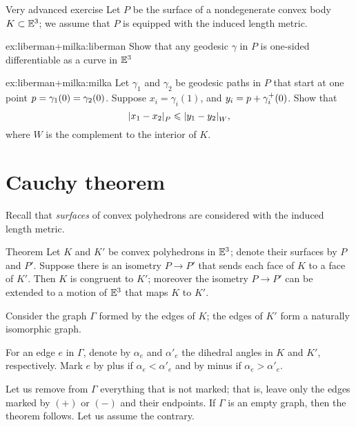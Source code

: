 \begin{thm}{Very advanced exercise}\label{ex:liberman+milka}
Let $P$ be the surface of a nondegenerate convex body $K\subset\mathbb{E}^3$;
we assume that $P$ is equipped with the induced length metric.

\begin{subthm}{ex:liberman+milka:liberman}
Show that any geodesic $\gamma$ in $P$ is one-sided differentiable as a curve in $\mathbb{E}^3$
\end{subthm}

\begin{subthm}{ex:liberman+milka:milka}
Let $\gamma_1$ and $\gamma_2$ be geodesic paths in $P$ that start at one point $p=\gamma_1(0)=\gamma_2(0)$.
Suppose $x_i=\gamma_i(1)$, and $y_i=p+\gamma_i^+(0)$.
Show that
\[|{x_1}-{x_2}|_{P}^{{}}\leqslant |{y_1}-{y_2}|_{W}^{{}},\]
where $W$ is the complement to the interior of $K$.
\end{subthm}

\end{thm}


\section{Cauchy theorem}

Recall that \textit{surfaces} of convex polyhedrons are considered with the induced length metric.
 
\begin{thm}{Theorem}\label{thm:cauchy} Let $K$ and $K'$ be convex polyhedrons in $\mathbb{E}^3$;
denote their surfaces 
by $P$ and $P'$.
Suppose there is an isometry $P\to P'$ that sends each face of $K$ to a face of $K'$.
Then $K$ is congruent to $K'$; moreover the isometry $P\to P'$ can be extended to a motion of $\mathbb{E}^3$ that maps $K$  to $K'$.
\end{thm}

Consider the graph $\Gamma$ formed by the edges of $K$;
the edges of $K'$ form a naturally isomorphic graph.
 
For an edge $e$ in $\Gamma$, denote by $\alpha_e$ and $\alpha'_e$ the dihedral angles in $K$ and $K'$, respectively.
Mark $e$ by plus if $\alpha_e < \alpha'_e$ and by minus if $\alpha_e > \alpha'_e$.

Let us remove from $\Gamma$ everything that is not marked;
that is, leave only the edges marked by $(+)$ or $(-)$ and their endpoints.
If $\Gamma$ is an empty graph, then the theorem follows.
Let us assume the contrary.

